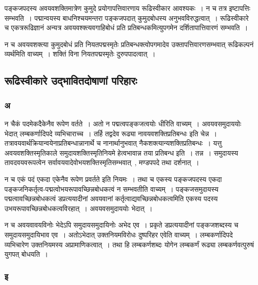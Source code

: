 			पङ्कजपदस्य अवयवशक्तिमात्रेण  कुमुदे प्रयोगापत्तिवारणाय रूढिस्वीकार आवश्यकः~। न च तत्र इष्टापत्तिः सम्भवति~। पद्मान्वयस्य  बाधनिश्चयमन्तरा पङ्कजपदात्  कुमुदबोधस्य अनुभवविरुद्धत्वात्~। रूढिस्वीकारे च एकत्ररूढिज्ञानं अन्यत्र अवयवश्क्त्यवगाहिबोधं प्रति प्रतिबन्धकमित्युपगमेन दर्शितापात्तिवारणं सम्भवति~।

			न च अवयवशक्त्या कुमुदबोधं प्रति नियतपद्मस्मृतेः प्रतिबन्धक्त्वोपगमादेव उक्तापत्तिवारणसम्भवात्  रूढिकल्पनं व्यर्थमिति वाच्यम्~। शक्तिं विना नियतपद्मस्मृतेः दुरुपपादत्वात्~।

		\subsection{रूढिस्वीकारे उद्भावितदोषाणां परिहारः}
		
			\subsubsection{अ}
		
				\begin{small}
			
					न चैकं पदमेकदैकेनैव रूपेण वर्तते~। अतो न पद्मत्वपङ्कजत्वयोः धीरिति वाच्यम्~। अवयवसमुदाययोः भेदात् लम्बकर्णादिपदे व्यभिचाराच्च~। तर्हि तद्वदेव रूढ्या नावयवशक्तिप्रतिबन्धः इति चेन्न~। तत्रावयवार्थक्रियान्वयेनाप्रतिबन्धान्नानार्थे च नानार्थानुभवात् नैकशक्त्यान्यशक्तिप्रतिबन्धः~। यत्तु अवयवशक्तिस्मृतिकाले समुदायशक्तिस्मृतिनियमे हेत्वभावान्न तया प्रतिबन्ध इति~। तन्न~। समुदायस्य तावदवयवरूपत्वेन सर्वावयवादेवोभयशक्तिस्मृतिसम्भवात्~, मण्डपपदे तथा दर्शनात्~।
				\end{small}
		
			न च एकं पदं एकदा एकेनैव रूपेण प्रवर्तते इति नियमः~। तथा च एकस्य पङ्कजपदस्य एकदा पङ्कजनिकर्तृत्व-पद्मत्वोभयरूपावच्छिन्नबोधकत्वं  न सम्भवतीति वाच्यम्~। पङ्कजसमुदायस्य पद्मत्वावच्छिन्नबोधकत्वं डप्रत्ययादीनां अवयवानां कर्तृत्वाद्यवच्छिन्नबोधकत्वमिति एकस्य पदस्य उभयरूपावच्छिन्नबोधकत्वविरहात्~। अवयवसमुदाययोः भेदात्~। 
  
			न च अवयवावयविनोः भेदेऽपि समुदायसमुदायिनोः अभेद एव~। प्रकृते डप्रत्ययादीनां पङ्कजशब्दस्य च समुदायसमुदायिभाव एव~। अतोऽभेदात् उक्तनियमविरोधः दुष्परिहर एवेति वाच्यम्~। लम्बकर्णादिपदे व्यभिचारेण उक्तनियमस्य अप्रामाणिकत्वात्~। तथा हि लम्बकर्णशब्दः योगेन लम्बकर्णं रूढ्या लम्बकर्णवत्पुरुषं युगपत् बोधयति~।

			
			\subsubsection{इ}

